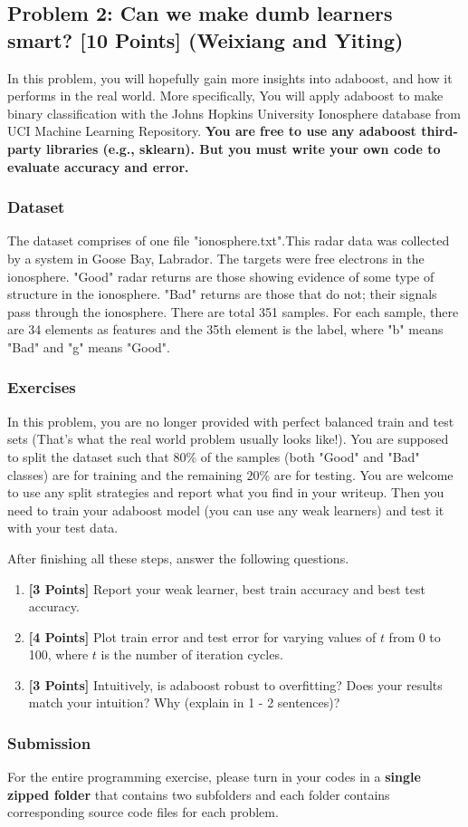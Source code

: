 \documentclass{article}
\begin{document}
\subsection*{Problem 2: Can we make dumb learners smart?
 [10 Points] (Weixiang and Yiting)}
In this problem, you will hopefully gain more insights into adaboost, and how it performs in the real world. More specifically, You will apply adaboost to make binary classification with the Johns Hopkins University Ionosphere database from UCI Machine Learning Repository. \textbf{You are free to use any adaboost third-party libraries (e.g., sklearn). But you must write your own code to evaluate accuracy and error.} 

\subsubsection*{Dataset}
The dataset comprises of one file "ionosphere.txt".This radar data was collected by a system in Goose Bay, Labrador. The targets were free electrons in the ionosphere. "Good" radar returns are those showing evidence of some type of structure in the ionosphere. "Bad" returns are those that do not; their signals pass through the ionosphere. There are total 351 samples. For each sample, there are 34 elements as features and the 35th element is the label, where "b" means "Bad" and "g" means "Good".

\subsubsection*{Exercises}
In this problem, you are no longer provided with perfect balanced train and test sets (That's what the real world problem usually looks like!). You are supposed to split the dataset such that $80\%$ of the samples (both "Good" and "Bad" classes) are for training and the remaining $20\%$ are for testing. You are welcome to use any split strategies and report what you find in your writeup. Then you need to train your adaboost model (you can use any weak learners) and test it with your test data.

After finishing all these steps, answer the following questions.

\begin{enumerate}
	\item \textbf{[3 Points]} Report your weak learner, best train accuracy and best test accuracy.
	
	\item \textbf{[4 Points]} Plot train error and test error for varying values of $t$ from 0 to 100, where $t$ is the number of iteration cycles. 
	
	\item \textbf{[3 Points]} Intuitively, is adaboost robust to overfitting? Does your results match your intuition? Why (explain in 1 - 2 sentences)?
	
\end{enumerate}

\subsubsection*{Submission}
For the entire programming exercise, please turn in your codes in a \textbf{single zipped folder} that contains two subfolders and each folder contains corresponding source code files for each problem.
\end{document}
